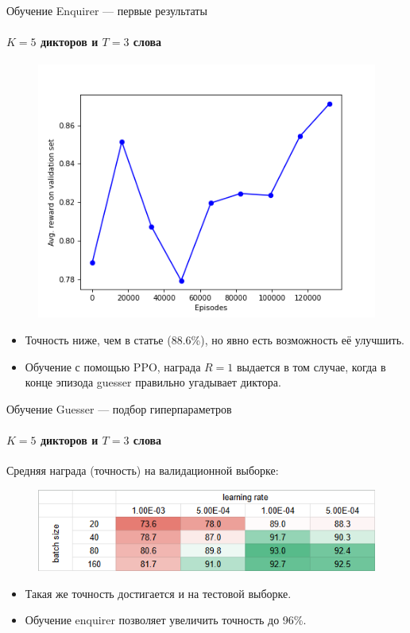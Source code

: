 \documentclass[aspectratio=169]{beamer}
\begin{document}
\begin{frame}{Обучение Enquirer --- первые результаты}
    \framesubtitle{$K = 5$ дикторов и $T = 3$ слова}
    \begin{figure}
        \centering
        \includegraphics[scale=0.4]{enquirer_training_v1.png}
    \end{figure}
    \begin{itemize}
        \item Точность ниже, чем в статье (88.6\%), но явно есть возможность её
        улучшить.
        \item Обучение с помощью PPO, награда $R=1$ выдается в том случае, когда
        в конце эпизода guesser правильно угадывает диктора.
    \end{itemize}
\end{frame}

\begin{frame}{Обучение Guesser --- подбор гиперпараметров}
    \framesubtitle{$K = 5$ дикторов и $T = 3$ слова}
    Средняя награда (точность) на валидационной выборке:
    \begin{figure}
        \centering
        \includegraphics[width=.7\textwidth]{guesser_hpo.png}
    \end{figure}
    \begin{itemize}
        \item Такая же точность достигается и на тестовой выборке.
        \item Обучение enquirer позволяет увеличить точность до 96\%.
    \end{itemize}
\end{frame}
\end{document}
